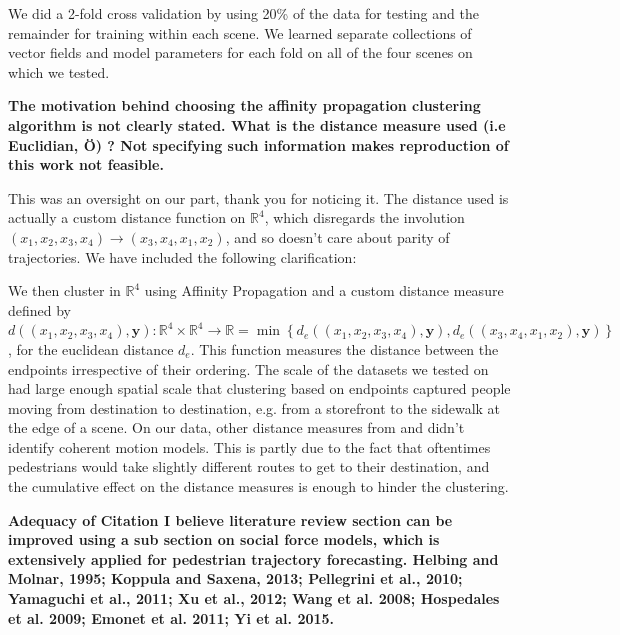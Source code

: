 \documentclass[usenames,dvipsnames]{article}
\providecommand{\response}[1]{
\noindent
\noindent\colorbox{gray!20}{
\parbox{\textwidth}{
\setlength{\parskip}{.1in}
\setlength{\parindent}{.1in}
#1}
}
}
\begin{document}
\begin{enumerate}
\reversemarginpar{}
\response{We did a 2-fold cross validation by using 20\% of the data for testing and the remainder for training within each scene. We learned separate collections of vector fields and model parameters for each fold on all of the four scenes on which we tested.}


\begin{item}
\textbf{The motivation behind choosing the affinity propagation clustering
algorithm is not clearly stated. 
What is the distance measure used (i.e Euclidian, \"{O}) ? Not specifying
such information makes reproduction of this work not feasible. }

This was an oversight on our part, thank you for noticing it. The distance used is actually a custom distance function on $\mathbb{R}^4$, which disregards the involution $(x_1, x_2, x_3, x_4) \to (x_3, x_4, x_1, x_2)$, and so doesn't care about parity of trajectories. We have included the following clarification:

\reversemarginpar{}
\response{We then cluster in $\mathbb{R}^4$ using Affinity Propagation \cite{FreyDueck2007} and a custom distance measure defined by $d((x_1, x_2, x_3, x_4),\mathbf{y}) : \mathbb{R}^4 \times \mathbb{R}^4 \to \mathbb{R} = \min \left\{ d_e((x_1, x_2, x_3, x_4), \mathbf{y}), d_e((x_3, x_4, x_1, x_2), \mathbf{y}) \right\}$, for the euclidean distance $d_e$. This function measures the distance between the endpoints irrespective of their ordering. The scale of the datasets we tested on had large enough spatial scale that clustering based on endpoints captured people moving from destination to destination, e.g. from a storefront to the sidewalk at the edge of a scene. On our data, other distance measures from \cite{Morris2009} and \cite{Lee2007} didn't identify coherent motion models. This is partly due to the fact that oftentimes pedestrians would take slightly different routes to get to their destination, and the cumulative effect on the distance measures is enough to hinder the clustering. }
	
\end{item}

\begin{item}
\textbf{Adequacy of Citation
I believe literature review section can be improved using a sub section
on social force models, which is extensively applied for pedestrian
trajectory forecasting. 
Helbing and Molnar, 1995; Koppula and Saxena, 2013; Pellegrini et al.,
2010; Yamaguchi et al., 2011; Xu et al., 2012; Wang et al. 2008;
Hospedales et al. 2009; Emonet et al. 2011; Yi et al. 2015.}
\end{item}


\end{enumerate}
\end{document}
